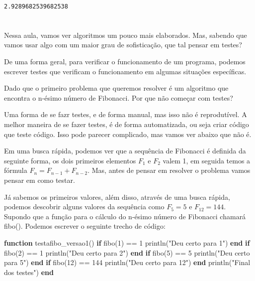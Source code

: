 \documentclass[
  letterpaper,
  DIV=11,
  numbers=noendperiod]{scrreprt}
\newenvironment{Shaded}{\begin{snugshade}}{\end{snugshade}}
\newcommand{\ControlFlowTok}[1]{\textcolor[rgb]{0.00,0.23,0.31}{\textbf{#1}}}
\newcommand{\FloatTok}[1]{\textcolor[rgb]{0.68,0.00,0.00}{#1}}
\newcommand{\FunctionTok}[1]{\textcolor[rgb]{0.28,0.35,0.67}{#1}}
\newcommand{\KeywordTok}[1]{\textcolor[rgb]{0.00,0.23,0.31}{\textbf{#1}}}
\newcommand{\NormalTok}[1]{\textcolor[rgb]{0.00,0.23,0.31}{#1}}
\newcommand{\OperatorTok}[1]{\textcolor[rgb]{0.37,0.37,0.37}{#1}}
\newcommand{\StringTok}[1]{\textcolor[rgb]{0.13,0.47,0.30}{#1}}
\begin{document}
\begin{verbatim}
2.9289682539682538
\end{verbatim}


\chapter{}\label{section}

Nessa aula, vamos ver algoritmos um pouco mais elaborados. Mas, sabendo
que vamos usar algo com um maior grau de sofisticação, que tal pensar em
testes?

De uma forma geral, para verificar o funcionamento de um programa,
podemos escrever testes que verificam o funcionamento em algumas
situações específicas.

Dado que o primeiro problema que queremos resolver é um algoritmo que
encontra o n-ésimo número de Fibonacci. Por que não começar com testes?

Uma forma de se fazr testes, e de forma manual, mas isso não é
reprodutível. A melhor maneira de se fazer testes, é de forma
automatizada, ou seja criar código que teste código. Isso pode parecer
complicado, mas vamos ver abaixo que não é.

Em uma busca rápida, podemos ver que a sequência de Fibonacci é definida
da seguinte forma, os dois primeiros elementos \(F_1\) e \(F_2\) valem
1, em seguida temos a fórmula \(F_n = F_{n-1} +  F_{n-2}\). Mas, antes
de pensar em resolver o problema vamos pensar em como testar.

Já sabemos os primeiros valores, além disso, através de uma busca
rápida, podemos descobrir alguns valores da sequência como \(F_5 =  5\)
e \(F_{12}  =
144\). Supondo que a função para o cálculo do n-ésimo número de
Fibonacci chamará fibo(). Podemos escrever o seguinte trecho de código:

\begin{Shaded}
\begin{Highlighting}[]
\KeywordTok{function} \FunctionTok{testafibo\_versao1}\NormalTok{()}
  \ControlFlowTok{if} \FunctionTok{fibo}\NormalTok{(}\FloatTok{1}\NormalTok{) }\OperatorTok{==} \FloatTok{1}
    \FunctionTok{println}\NormalTok{(}\StringTok{"Deu certo para 1"}\NormalTok{)}
  \ControlFlowTok{end}
  \ControlFlowTok{if} \FunctionTok{fibo}\NormalTok{(}\FloatTok{2}\NormalTok{) }\OperatorTok{==} \FloatTok{1}
    \FunctionTok{println}\NormalTok{(}\StringTok{"Deu certo para 2"}\NormalTok{)}
  \ControlFlowTok{end}
  \ControlFlowTok{if} \FunctionTok{fibo}\NormalTok{(}\FloatTok{5}\NormalTok{) }\OperatorTok{==} \FloatTok{5}
    \FunctionTok{println}\NormalTok{(}\StringTok{"Deu certo para 5"}\NormalTok{)}
  \ControlFlowTok{end}
  \ControlFlowTok{if} \FunctionTok{fibo}\NormalTok{(}\FloatTok{12}\NormalTok{) }\OperatorTok{==} \FloatTok{144}
    \FunctionTok{println}\NormalTok{(}\StringTok{"Deu certo para 12"}\NormalTok{)}
  \ControlFlowTok{end}
  \FunctionTok{println}\NormalTok{(}\StringTok{"Final dos testes"}\NormalTok{)}
\KeywordTok{end}
\end{Highlighting}
\end{Shaded}
\end{document}
